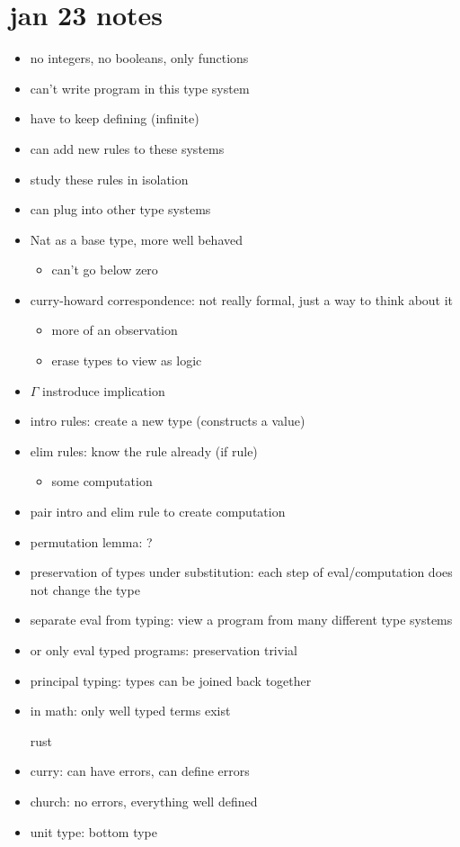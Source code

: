 \documentclass[11pt]{article}
\begin{document}
\section{jan 23 notes}
\label{sec:org3f9d011}
\begin{itemize}
\item no integers, no booleans, only functions
\item can't write program in this type system
\item have to keep defining (infinite)
\item can add new rules to these systems
\item study these rules in isolation
\item can plug into other type systems
\item Nat as a base type, more well behaved
\begin{itemize}
\item can't go below zero
\end{itemize}
\item curry-howard correspondence: not really formal, just a way to think about it
\begin{itemize}
\item more of an observation
\item erase types to view as logic
\end{itemize}
\item \(\Gamma\) instroduce implication
\item intro rules: create a new type (constructs a value)
\item elim rules: know the rule already (if rule)
\begin{itemize}
\item some computation
\end{itemize}
\item pair intro and elim rule to create computation
\item permutation lemma: ?
\item preservation of types under substitution: each step of eval/computation does not change the type
\item separate eval from typing: view a program from many different type systems
\item or only eval typed programs: preservation trivial
\item principal typing: types can be joined back together
\item in math: only well typed terms exist

rust
\item curry: can have errors, can define errors
\item church: no errors, everything well defined

\item unit type: bottom type
\end{itemize}
\end{document}
